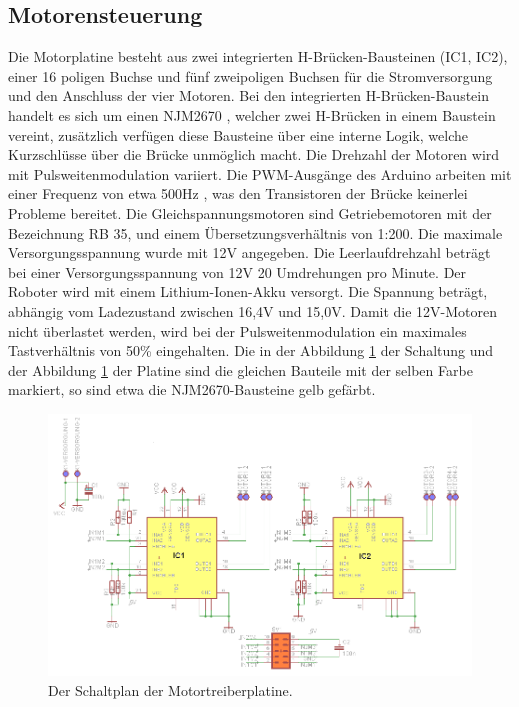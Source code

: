\documentclass[a4paper,bibtotoc,oneside]{scrbook}
\begin{document}
\FloatBarrier
 
\subsection{Motorensteuerung}\thispagestyle{empty}

Die Motorplatine besteht aus zwei integrierten H-Brücken-Bausteinen (IC1, IC2), einer 16 poligen Buchse und fünf zweipoligen Buchsen für die Stromversorgung und den Anschluss der vier Motoren. Bei den integrierten H-Brücken-Baustein handelt es sich um einen NJM2670 \cite{njm}, welcher zwei H-Brücken in einem Baustein vereint, zusätzlich verfügen diese Bausteine über eine interne Logik, welche Kurzschlüsse über die Brücke unmöglich macht.
Die Drehzahl der Motoren wird mit Pulsweitenmodulation variiert. Die PWM-Ausgänge des Arduino arbeiten mit einer Frequenz von etwa 500Hz \cite{pwm}, was den Transistoren der Brücke keinerlei Probleme bereitet.
Die Gleichspannungsmotoren sind Getriebemotoren mit der Bezeichnung RB 35, und einem Übersetzungsverhältnis von 1:200. Die maximale Versorgungsspannung wurde mit 12V angegeben. Die Leerlaufdrehzahl beträgt bei einer Versorgungsspannung von 12V 20 Umdrehungen pro Minute.
Der Roboter wird mit einem Lithium-Ionen-Akku versorgt. Die Spannung beträgt, abhängig vom Ladezustand zwischen 16,4V und 15,0V. Damit die 12V-Motoren nicht überlastet werden, wird bei der Pulsweitenmodulation ein maximales Tastverhältnis von 50\% eingehalten.
Die in der Abbildung \ref{hbridge1} der Schaltung und der Abbildung \ref{hbridge1} der Platine sind die gleichen Bauteile mit der selben Farbe markiert, so sind etwa die NJM2670-Bausteine gelb gefärbt.

\begin{figure}[htbp]
\centering
\includegraphics[width=150mm]{img/HBrucke.png}
\caption{Der Schaltplan der Motortreiberplatine.}\label{hbridge1}
\end{figure}
\end{document}

